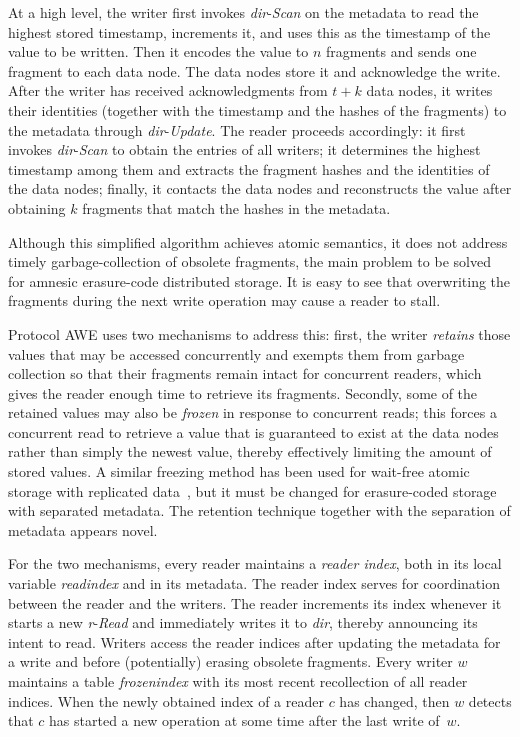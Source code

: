 \documentclass[oribibl]{llncs}
\theoremstyle{definition-boldhead}
\newcommand{\var}[1]{\textit{#1}}
\newcommand{\op}[1]{\textsl{#1}}
\newcommand{\dir}{\var{dir}\xspace}
\newcommand{\NAME}{AWE\xspace}
\newcommand{\node}{node\xspace}
\newcommand{\nodes}{nodes\xspace}
\begin{document}
At a high level, the writer first invokes \dir-\op{Scan} on the
metadata to read the highest stored timestamp, increments it, and uses
this as the timestamp of the value to be written.  Then it encodes the
value to $n$ fragments and sends one fragment to each data \node.
The data \nodes store it and acknowledge the write.  After the
writer has received acknowledgments from $t+k$ data \nodes, it
writes their identities (together with the timestamp and the hashes of
the fragments) to the metadata through \dir-\op{Update}.  The reader
proceeds accordingly: it first invokes \dir-\op{Scan} to obtain the
entries of all writers; it determines the highest timestamp among them
and extracts the fragment hashes and the identities of the data
\nodes; finally, it contacts the data \nodes and reconstructs the
value after obtaining $k$ fragments that match the hashes in the
metadata.

Although this simplified algorithm achieves atomic semantics, it does
not address timely garbage-collection of obsolete fragments, the main
problem to be solved for amnesic erasure-code distributed storage.
It is easy to see that overwriting the fragments during the next write
operation may cause a reader to stall.




Protocol \NAME uses two mechanisms to address this: first, the writer
\emph{retains} those values that may be accessed concurrently and
exempts them from garbage collection so that their fragments remain
intact for concurrent readers, which gives the reader enough time to
retrieve its fragments. Secondly, some of the retained values may also
be \emph{frozen} in response to concurrent reads; this forces a
concurrent read to retrieve a value that is guaranteed to exist at the
data \nodes rather than simply the newest value, thereby effectively
limiting the amount of stored values. A similar freezing method has
been used for wait-free atomic storage with replicated
data~\cite{gulevu06,domasu08}, but it must be changed for
erasure-coded storage with separated metadata.  The retention
technique together with the separation of metadata appears novel.

For the two mechanisms, every reader maintains a \emph{reader index}, both in its
local variable \var{readindex} and in its metadata. The reader index serves for
coordination between the reader and the writers. The reader increments its index
whenever it starts a new \var{r}-\op{Read} and immediately writes it to \dir, thereby
announcing its intent to read. Writers access the reader indices after updating
the metadata for a write and before (potentially) erasing obsolete fragments.
Every writer $w$ maintains a table \var{frozenindex} with its most
recent recollection of all reader indices. When the newly obtained index of a
reader $c$ has changed, then $w$ detects that $c$ has started a new operation
at some time after the last write of~$w$.
\end{document}

